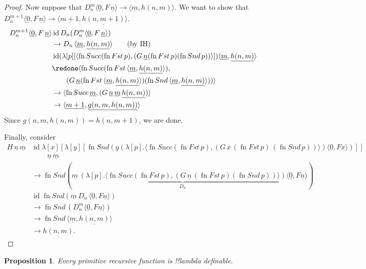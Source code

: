 \documentclass[10pt,a4paper]{article}
\theoremstyle{plain}
\newtheorem{prop}[thm]{Proposition}
\theoremstyle{definition}
\theoremstyle{remark}
\providecommand{\tuple}[1]{\langle #1 \rangle}
\providecommand{\num}[1]{\underline{#1}}
\providecommand{\lambd}{\ensuremath{\lambda}}
\providecommand{\ident}{\operatorname{id}}
\providecommand{\red}{\mathrel{\rightarrow}}
\providecommand{\fn}{\operatorname{fn}}
\providecommand{\red}{\mathrel{\rightarrow}}
\providecommand{\fn}{\operatorname{fn}}
\begin{document}
\begin{proof}
  Now suppose that $D_n^m \tuple{\num{0}, F\, \num{n}} \red
  \tuple{\num{m}, \num{h(n, m)}}$. We want to
  show that $D_n^{m+1} \tuple{\num{0}, F\, \num{n}} \red
  \tuple{\num{m+1}, \num{h(n, m+1)}}$.
  \begin{align*}
    D_n^{m+1} \tuple{\num{0}, F\, \num{n}}
    & \ident D_n(D_n^{m} \tuple{\num{0}, F\, \num{n}})\\
    & \red D_n\,\tuple{\num{m}, \num{h(n, m)}} \text{\qquad (by IH)}\\
    & \ident (\lambd[p][
      \tuple{
        \fn{Succ} (\fn{Fst}\, p), (G \, \num{n} (\fn{Fst}\, p) (\fn{Snd}\, p))
    }]) \tuple{\num{m}, \num{h(n,m)}}\\
    & \redone
    \tuple{\fn{Succ} (\fn{Fst}\, \tuple{\num{m}, \num{h(n,m)}}),\\
      & \qquad (G \, \num{n} (\fn{Fst}\, \tuple{\num{m}, \num{h(n,m)}}) (\fn{Snd}\, \tuple{\num{m}, \num{h(n,m)}}))}\\
    & \red 
    \tuple{\fn{Succ}\, \num{m}, (G \, \num{n} \,\num{m} \, \num{h(n,m)})}\\
    & \red \tuple{\num{m+1}, \num{g(n, m, h(n, m))}}
  \end{align*}
  Since $g(n, m, h(n, m)) = h(n, m+1)$, we are done.

  Finally, consider
  \begin{align*}
    H\,\num n\,\num m &\ident \lambd[x][\lambd[y][\fn{Snd} (y
        (\lambd[p].\tuple{\fn{Succ} (\fn{Fst}\, p), (G\, x\,
          (\fn{Fst}\, p)\, (\fn{Snd}\, p))}) \tuple{\num{0}, F x})]]\\
    & \qquad\,\num n\, \num m\\
    & \red \fn{Snd} (\num m \,
    \underbrace{(\lambd[p].\tuple{\fn{Succ} (\fn{Fst}\, p), (G \,\num n\,
      (\fn{Fst}\, p) (\fn{Snd}\, p))})}_{D_n} \tuple{\num{0}, F \num n})\\
    & \ident \fn{Snd} (\num m \, D_n\, \tuple{\num{0}, F \num n})\\
    & \red \fn{Snd} \,(D_n^m  \tuple{\num{0}, F \num n})\\
    & \red \fn{Snd} \,\tuple{\num{m}, \num{h(n, m)}} \\
    & \red \num{h(n,m)}. 
  \end{align*}  
\end{proof}


\begin{prop}
  Every primitive recursive function is !!{lambda definable}.
\end{prop}
\end{document}
